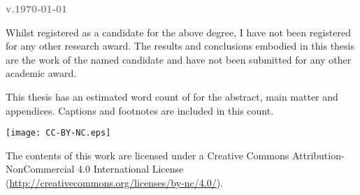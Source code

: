 %

\clearpage
\thispagestyle{empty}

\hypertarget{colophon}{}

\begin{colophon}

\ifdraftdoc
	\textcolor{gray}{\textbf{\ttfamily\bfseries v.\today}}
\fi

\null\vfill

\newdimen\licencewidth
{}

\begin{minipage}{\textwidth}
    Whilst registered as a candidate for the above degree, I have not been registered for any other research award. The results and conclusions embodied in this thesis are the work of the named candidate and have not been submitted for any other academic award.

    \bigskip

    This thesis has an estimated word count of  for the abstract, main matter and appendices. Captions and footnotes are included in this count.

    \vspace{15mm}

    \begin{minipage}[b]{\licencewidth}
        \vspace{-3pt}\texttt{[image: CC-BY-NC.eps]}
    \end{minipage}%
    \hspace{1em}%
    \begin{minipage}[b]{\textwidth-\licencewidth-1em}
        The contents of this work are licensed under a Creative Commons Attribution-NonCommercial 4.0 International License (\url{http://creativecommons.org/licenses/by-nc/4.0/}).
    \end{minipage}%


\end{minipage}
\end{colophon}
